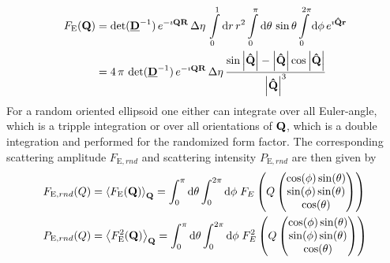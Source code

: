 \begin{align}
F_\mathrm{E}(\B{Q}) &=
\det(\M{D}^{-1})\, e^{-\imath\B{QR}}\, \Delta\eta\, \int\limits_0^1
\mathrm{d}r\, r^2 \int\limits_0^{\pi} \mathrm{d}\theta\, \sin \theta \int\limits_0^{2\pi}
\mathrm{d}\phi \, e^{\imath\B{\hat{Q}r}} \nonumber \\
&=
\displaystyle 4\, \pi\, \det(\M{D}^{-1})\, e^{-\imath\B{QR}}\,
\Delta\eta\, \frac{\sin \abs{\B{\hat{Q}}}-
\abs{\B{\hat{Q}}}\cos \abs{\B{\hat{Q}}}}{\abs{\B{\hat{Q}}}^3}
\label{eq:form:E}
\end{align}
For a random oriented ellipsoid one either can integrate over all Euler-angle, which is a tripple integration or over all orientations of $\B{Q}$, which is a double integration and performed for the randomized form factor. The corresponding scattering amplitude $F_{\mathrm{E},rnd}$ and scattering intensity $P_{\mathrm{E},rnd}$ are then given by
\begin{align}
F_{\mathrm{E},rnd}(Q) &= \left\langle F_\mathrm{E}(\B{Q})\right\rangle_\B{Q} = \int_0^\pi\mathrm{d}\theta \int_0^{2\pi}\mathrm{d}\phi \; F_E\left(Q\begin{pmatrix}
                                       \cos(\phi)\sin(\theta) \\
                                       \sin(\phi)\sin(\theta) \\
                                       \cos(\theta)
                                     \end{pmatrix}\right) \\
P_{\mathrm{E},rnd}(Q) &= \left\langle F_\mathrm{E}^2(\B{Q})\right\rangle_\B{Q} = \int_0^\pi\mathrm{d}\theta \int_0^{2\pi}\mathrm{d}\phi \; F_E^2\left(Q\begin{pmatrix}
                                       \cos(\phi)\sin(\theta) \\
                                       \sin(\phi)\sin(\theta) \\
                                       \cos(\theta)
                                     \end{pmatrix}\right)
\end{align}

